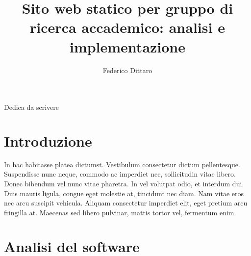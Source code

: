 \documentclass[target=bach,aauheader=]{thud}
\title{Sito web statico per gruppo di ricerca accademico: analisi e implementazione}
\author{Federico Dittaro}
\begin{document}
\maketitle

\newpage 
Dedica da scrivere 

\tableofcontents



\mainmatter


\chapter{Introduzione}
In hac habitasse platea dictumst. Vestibulum consectetur dictum pellentesque. Suspendisse nunc neque, commodo ac imperdiet nec, sollicitudin vitae libero. Donec bibendum vel nunc vitae pharetra. In vel volutpat odio, et interdum dui. Duis mauris ligula, congue eget molestie at, tincidunt nec diam. Nam vitae eros nec arcu suscipit vehicula. Aliquam consectetur imperdiet elit, eget pretium arcu fringilla at. Maecenas \cite{Knu86} sed libero pulvinar, mattis tortor vel, fermentum enim.

\chapter{Analisi del software}

\end{document}
